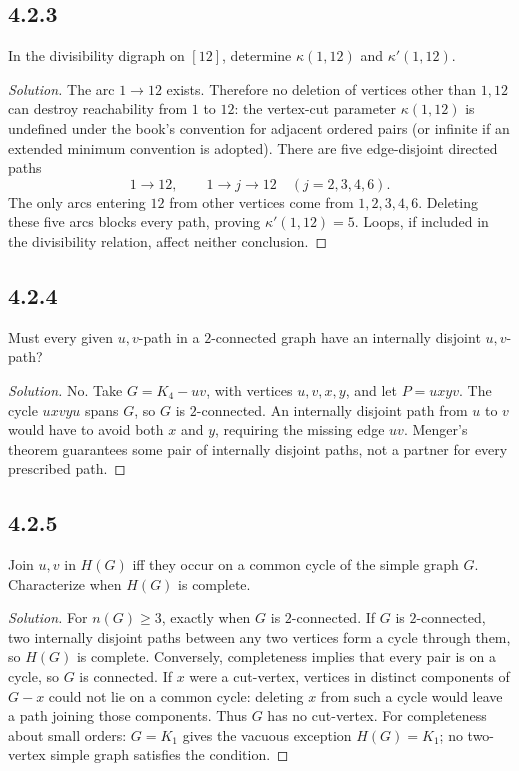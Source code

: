 \documentclass[12pt]{amsart}
\newenvironment{solution}{\begin{proof}[Solution]}{\end{proof}}
\begin{document}
    \subsection*{4.2.3} In the divisibility digraph on $[12]$, determine $\kappa(1,12)$ and $\kappa'(1,12)$.
    \begin{solution}The arc $1\to12$ exists. Therefore no deletion of vertices other than $1,12$ can destroy reachability from $1$ to $12$: the vertex-cut parameter $\kappa(1,12)$ is undefined under the book's convention for adjacent ordered pairs (or infinite if an extended minimum convention is adopted).
    There are five edge-disjoint directed paths
        \[
            1\to12,\qquad 1\to j\to12\quad(j=2,3,4,6).
        \]
        The only arcs entering $12$ from other vertices come from $1,2,3,4,6$. Deleting these five arcs blocks every path, proving $\kappa'(1,12)=5$. Loops, if included in the divisibility relation, affect neither conclusion.\end{solution}

    \subsection*{4.2.4} Must every given $u,v$-path in a $2$-connected graph have an internally disjoint $u,v$-path?
    \begin{solution}No. Take $G=K_4-uv$, with vertices $u,v,x,y$, and let $P=u x y v$. The cycle $u x v y u$ spans $G$, so $G$ is $2$-connected. An internally disjoint path from $u$ to $v$ would have to avoid both $x$ and $y$, requiring the missing edge $uv$. Menger's theorem guarantees some pair of internally disjoint paths, not a partner for every prescribed path.\end{solution}

    \subsection*{4.2.5} Join $u,v$ in $H(G)$ iff they occur on a common cycle of the simple graph $G$. Characterize when $H(G)$ is complete.
    \begin{solution}For $n(G)\ge3$, exactly when $G$ is $2$-connected. If $G$ is $2$-connected, two internally disjoint paths between any two vertices form a cycle through them, so $H(G)$ is complete. Conversely, completeness implies that every pair is on a cycle, so $G$ is connected. If $x$ were a cut-vertex, vertices in distinct components of $G-x$ could not lie on a common cycle: deleting $x$ from such a cycle would leave a path joining those components. Thus $G$ has no cut-vertex.
    For completeness about small orders: $G=K_1$ gives the vacuous exception $H(G)=K_1$; no two-vertex simple graph satisfies the condition.\end{solution}
\end{document}
